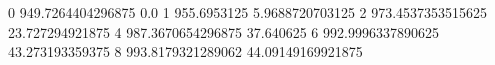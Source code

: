 0 949.7264404296875 0.0
1 955.6953125 5.9688720703125
2 973.4537353515625 23.727294921875
4 987.3670654296875 37.640625
6 992.9996337890625 43.273193359375
8 993.8179321289062 44.09149169921875
